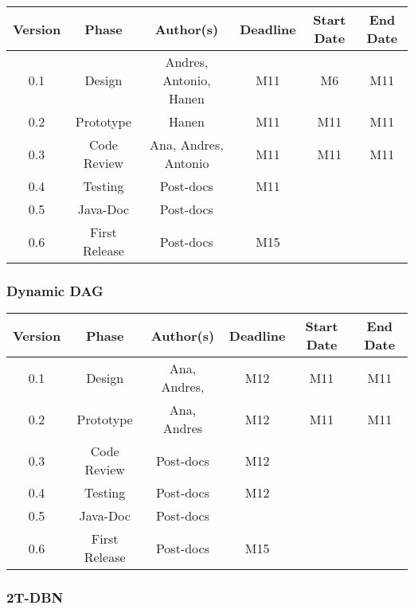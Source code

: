 \begin{table}[H]
\begin{tabular}{cccccc}
\hline
\textbf{Version} & \textbf{Phase} & \textbf{Author(s)} & \textbf{Deadline} & \textbf{Start Date} & \textbf{End Date}\\
\hline
0.1 & Design & Andres, Antonio, Hanen &  M11  & M6 & M11\\
\hline 
0.2 & Prototype & Hanen &  M11 & M11 & M11\\
\hline 
0.3 & Code Review & Ana, Andres, Antonio & M11  & M11  & M11\\
\hline 
0.4 & Testing & Post-docs & M11 &  & \\
\hline 
0.5 & Java-Doc  & Post-docs &  &  & \\
\hline 
0.6 & First Release & Post-docs & M15 &  & \\
\hline
\end{tabular}
\end{table}

\subsubsection*{Dynamic DAG}

\begin{table}[H]
\begin{tabular}{cccccc}
\hline
\textbf{Version} & \textbf{Phase} & \textbf{Author(s)} & \textbf{Deadline} & \textbf{Start Date} & \textbf{End Date}\\
\hline
0.1 & Design & Ana, Andres, &  M12 & M11 & M11\\
\hline 
0.2 & Prototype & Ana, Andres &  M12  & M11 & M11\\
\hline 
0.3 & Code Review &  Post-docs &  M12  &  & \\
\hline 
0.4 & Testing & Post-docs & M12 &  & \\
\hline 
0.5 & Java-Doc  & Post-docs &  &  & \\
\hline 
0.6 & First Release & Post-docs & M15 &  & \\
\hline
\end{tabular}
\end{table}

\subsubsection*{2T-DBN}


